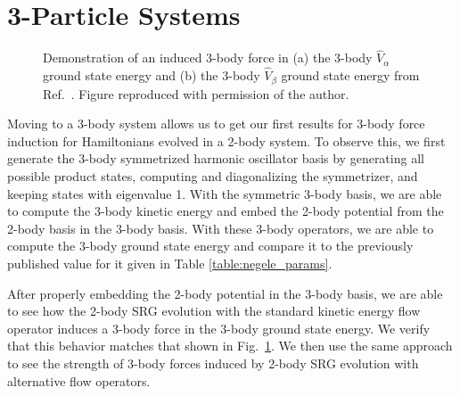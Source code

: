 \section{3-Particle Systems}

\begin{figure}[t]
\begin{center}
\hfill
{}
\end{center}
\caption{Demonstration of an induced 3-body force in (a) the 3-body $\hat{V}_\alpha$ ground state energy and (b) the 3-body $\hat{V}_\beta$ ground state energy from Ref.~\cite{Jurgenson:2008jp}. Figure reproduced with permission of the author.}
\label{fig:jurg_vfull}
\end{figure}

Moving to a 3-body system allows us to get our first results for 3-body force induction for Hamiltonians evolved in a 2-body system. To observe this, we first generate the 3-body symmetrized harmonic oscillator basis by generating all possible product states, computing and diagonalizing the symmetrizer, and keeping states with eigenvalue 1. With the symmetric 3-body basis, we are able to compute the 3-body kinetic energy and embed the 2-body potential from the 2-body basis in the 3-body basis. With these 3-body operators, we are able to compute the 3-body ground state energy and compare it to the previously published value for it given in Table \ref{table:negele_params}.

After properly embedding the 2-body potential in the 3-body basis, we are able to see how the 2-body SRG evolution with the standard kinetic energy flow operator induces a 3-body force in the 3-body ground state energy. We verify that this behavior matches that shown in Fig.~\ref{fig:jurg_vfull}. We then use the same approach to see the strength of 3-body forces induced by 2-body SRG evolution with alternative flow operators.

